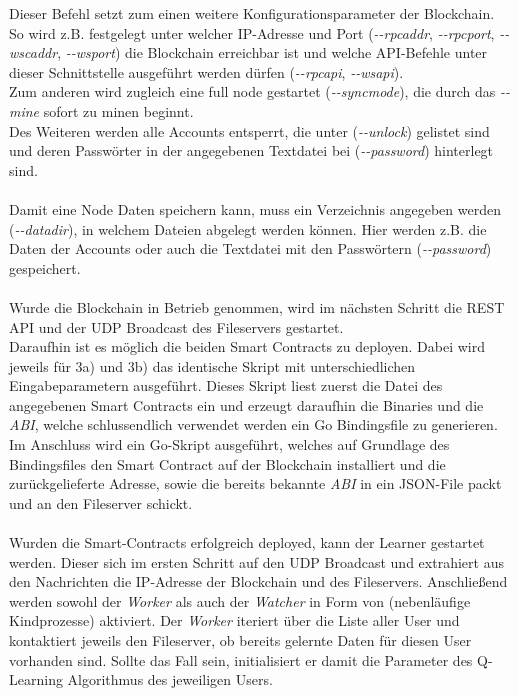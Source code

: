Dieser Befehl setzt zum einen weitere Konfigurationsparameter der Blockchain. So wird z.B. festgelegt unter welcher IP-Adresse und Port (\textit{-{}-rpcaddr}, \textit{-{}-rpcport}, \textit{-{}-wscaddr}, \textit{-{}-wsport}) die Blockchain erreichbar ist und welche API-Befehle unter dieser Schnittstelle ausgeführt werden dürfen (\textit{-{}-rpcapi}, \textit{-{}-wsapi}). \\
Zum anderen wird zugleich eine full node gestartet (\textit{-{}-syncmode}), die durch das  \textit{-{}-mine} sofort zu minen beginnt.\\
Des Weiteren werden alle Accounts entsperrt, die unter (\textit{-{}-unlock}) gelistet sind und deren Passwörter in der angegebenen Textdatei bei (\textit{-{}-password}) hinterlegt sind. \\\\
Damit eine Node Daten speichern kann, muss ein Verzeichnis angegeben werden (\textit{-{}-datadir}), in welchem Dateien abgelegt werden können. Hier werden z.B. die Daten der Accounts oder auch die Textdatei mit den Passwörtern (\textit{-{}-password}) gespeichert.\\\\
Wurde die Blockchain in Betrieb genommen, wird im nächsten Schritt die REST API und der UDP Broadcast des Fileservers gestartet. \\
Daraufhin ist es möglich die beiden Smart Contracts zu deployen. Dabei wird jeweils für 3a) und 3b) das identische Skript mit unterschiedlichen Eingabeparametern ausgeführt. Dieses Skript liest zuerst die Datei des angegebenen Smart Contracts ein und erzeugt daraufhin die Binaries und die \textit{ABI}, welche schlussendlich verwendet werden ein Go Bindingsfile zu generieren.
Im Anschluss wird ein Go-Skript ausgeführt, welches auf Grundlage des Bindingsfiles den Smart Contract auf der Blockchain installiert und die zurückgelieferte Adresse, sowie die bereits bekannte \textit{ABI} in ein JSON-File packt und an den Fileserver schickt.\\\\
Wurden die Smart-Contracts erfolgreich deployed, kann der Learner gestartet werden. Dieser  sich im ersten Schritt auf den UDP Broadcast und extrahiert aus den Nachrichten die IP-Adresse der Blockchain und des Fileservers. Anschließend werden sowohl der \textit{Worker} als auch der \textit{Watcher} in Form von  (nebenläufige Kindprozesse) aktiviert. Der \textit{Worker} iteriert über die Liste aller User und kontaktiert jeweils den Fileserver, ob bereits gelernte Daten für diesen User vorhanden sind. Sollte das Fall sein, initialisiert er damit die Parameter des Q-Learning Algorithmus des jeweiligen Users.\\
